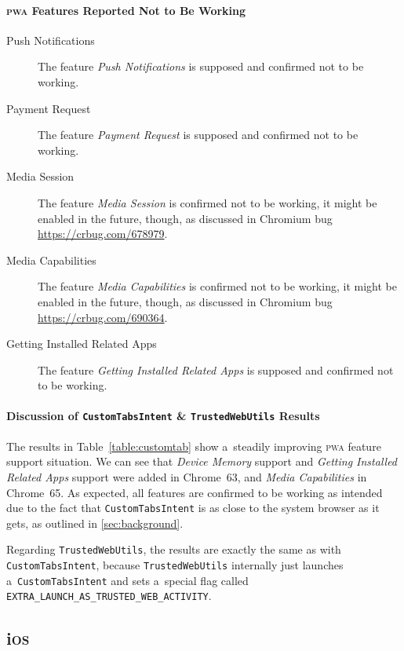 \documentclass[sigconf]{acmart}
\begin{document}
\paragraph{\textsc{pwa} Features Reported Not to Be Working}

\begin{description}
  \item[Push Notifications] The feature \emph{Push Notifications} is supposed and confirmed not to be working.
  \item[Payment Request] The feature \emph{Payment Request} is supposed and confirmed not to be working.
  \item[Media Session] The feature \emph{Media Session} is confirmed not to be working,
    it might be enabled in the future, though, as discussed in Chromium bug
    \url{https://crbug.com/678979}.
  \item[Media Capabilities] The feature \emph{Media Capabilities} is confirmed not to be working,
    it might be enabled in the future, though, as discussed in Chromium bug
    \url{https://crbug.com/690364}.
  \item[Getting Installed Related Apps] The feature \emph{Getting Installed Related Apps}
    is supposed and confirmed not to be working.
\end{description} 

\paragraph{\textbf{Discussion of \texttt{CustomTabsIntent} \& \texttt{TrustedWebUtils} Results}}

The results in Table~\ref{table:customtab} show
a~steadily improving \textsc{pwa} feature support situation. 
We can see that \emph{Device Memory} support and \emph{Getting Installed Related Apps} support
were added in Chrome~63, and \emph{Media Capabilities} in Chrome~65.
As expected, all features are confirmed to be working as intended
due to the fact that \texttt{CustomTabsIntent} is as close to the system browser as it gets,
as outlined in \autoref{sec:background}.

Regarding \texttt{TrustedWebUtils},
the results are exactly the same as with \texttt{CustomTabsIntent},
because \texttt{TrustedWebUtils} internally just launches a~\texttt{CustomTabsIntent}
and sets a~special flag called \texttt{EXTRA\_LAUNCH\_AS\_TRUSTED\_WEB\_ACTIVITY}.

\subsection{i\textsc{os}}
\end{document}
